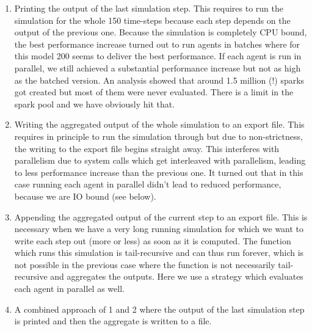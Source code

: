\begin{enumerate}
	
	\item Printing the output of the last simulation step. This requires to run the simulation for the whole 150 time-steps because each step depends on the output of the previous one. Because the simulation is completely CPU bound, the best performance increase turned out to run agents in batches where for this model 200 seems to deliver the best performance. If each agent is run in parallel, we still achieved a substantial performance increase but not as high as the batched version. An analysis showed that around 1.5 million (!) sparks got created but most of them were never evaluated. There is a limit in the spark pool and we have obviously hit that.
	
	\item Writing the aggregated output of the whole simulation to an export file. This requires in principle to run the simulation through but due to non-strictness, the writing to the export file begins straight away. This interferes with parallelism due to system calls which get interleaved with parallelism, leading to less performance increase than the previous one. It turned out that in this case running each agent in parallel didn't lead to reduced performance, because we are IO bound (see below).
	
	\item Appending the aggregated output of the current step to an export file. This is necessary when we have a very long running simulation for which we want to write each step out (more or less) as soon as it is computed. The function which runs this simulation is tail-recursive and can thus run forever, which is not possible in the previous case where the function is not necessarily tail-recursive and aggregates the outputs. Here we use a strategy which evaluates each agent in parallel as well.
	
	\item A combined approach of 1 and 2 where the output of the last simulation step is printed and then the aggregate is written to a file.
\end{enumerate}

